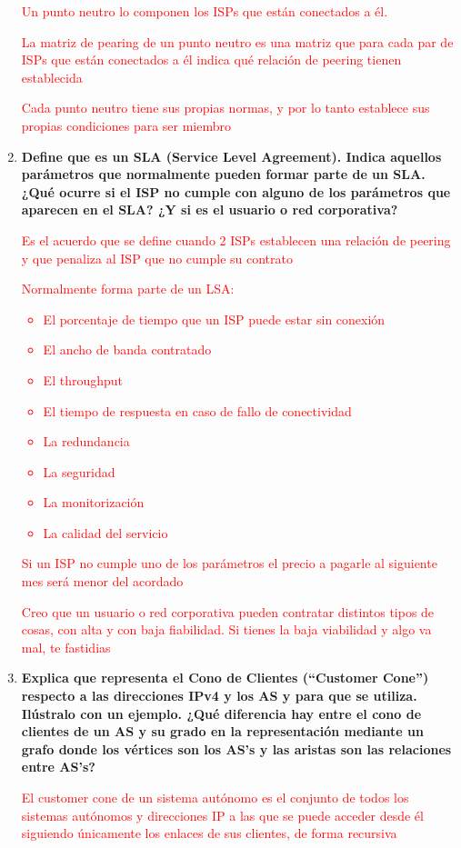 \documentclass[a4paper,10pt]{article}
\newcommand{\red}[1]{\textcolor{red}{#1}}
\begin{document}
\begin{enumerate}
\red{Un punto neutro lo componen los ISPs que están conectados a él.}

\red{La matriz de pearing de un punto neutro es una matriz que para cada par de ISPs que están conectados a él indica qué relación de peering tienen establecida}

\red{Cada punto neutro tiene sus propias normas, y por lo tanto establece sus propias condiciones para ser miembro}

  \item \textbf{Define que es un SLA (Service Level Agreement). Indica aquellos parámetros que
normalmente pueden formar parte de un SLA. ¿Qué ocurre si el ISP no cumple con alguno de los
parámetros que aparecen en el SLA? ¿Y si es el usuario o red corporativa?}

\red{Es el acuerdo que se define cuando 2 ISPs establecen una relación de peering y que penaliza al ISP que no cumple su contrato}

\red{Normalmente forma parte de un LSA:}
\red{
\begin{itemize}
  \item El porcentaje de tiempo que un ISP puede estar sin conexión
  \item El ancho de banda contratado
  \item El throughput
  \item El tiempo de respuesta en caso de fallo de conectividad
  \item La redundancia
  \item La seguridad
  \item La monitorización
  \item La calidad del servicio
\end{itemize}
}
\red{Si un ISP no cumple uno de los parámetros el precio a pagarle al siguiente mes será menor del acordado}

\red{Creo que un usuario o red corporativa pueden contratar distintos tipos de cosas, con alta y con baja fiabilidad. Si tienes la baja viabilidad y algo va mal, te fastidias}

  \item \textbf{Explica que representa el Cono de Clientes (“Customer Cone”) respecto a las direcciones
IPv4 y los AS y para que se utiliza. Ilústralo con un ejemplo. ¿Qué diferencia hay entre el cono de
clientes de un AS y su grado en la representación mediante un grafo donde los vértices son los
AS’s y las aristas son las relaciones entre AS’s?}

\red{El customer cone de un sistema autónomo es el conjunto de todos los sistemas autónomos y direcciones IP a las que se puede acceder desde él siguiendo únicamente los enlaces de sus clientes, de forma recursiva}


\end{enumerate}
\end{document}
